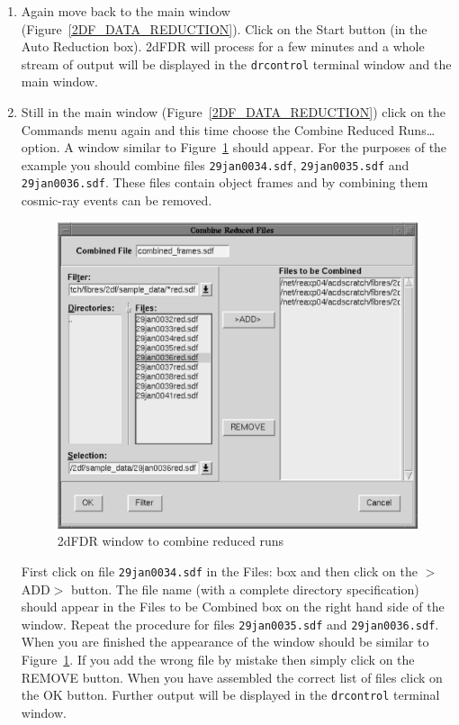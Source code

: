 \documentclass[twoside,11pt]{starlink}
\begin{document}
\begin{enumerate}
  \item Again move back to the main window
   (Figure~\ref{2DF_DATA_REDUCTION}).  Click on the \textsf{Start}
   button (in the \textsf{Auto Reduction} box).  2dFDR will process for a
   few minutes and a whole stream of output will be displayed in the
   \texttt{drcontrol} terminal window and the main window.

  \item Still in the main window (Figure~\ref{2DF_DATA_REDUCTION})
   click on the \textsf{Commands} menu again and this time choose the
   \textsf{Combine Reduced Runs\ldots} option.  A window similar to
   Figure~\ref{2DF_COMBINE_RUNS} should appear.  For the purposes of
   the example you should combine files \texttt{29jan0034.sdf},
   \texttt{29jan0035.sdf} and \texttt{29jan0036.sdf}.  These files contain
   object frames and by combining them cosmic-ray events can be
   removed.

  \begin{figure}[htbp]
     \centering
     \includegraphics[totalheight=4in]{sc14_2df_combine_runs}
     \caption{2dFDR window to combine reduced runs
     \label{2DF_COMBINE_RUNS} }
  \end{figure}

   First click on file \texttt{29jan0034.sdf} in the \textsf{Files:} box and
   then click on the \textsf{$>$ADD$>$} button.  The file name (with a
   complete directory specification) should appear in the \textsf{Files
   to be Combined} box  on the right hand side of the window.  Repeat
   the procedure for files \texttt{29jan0035.sdf} and \texttt{29jan0036.sdf}.
   When you are finished the appearance of the window should be similar
   to Figure~\ref{2DF_COMBINE_RUNS}.  If you add the wrong file by
   mistake then simply click on the \textsf{REMOVE} button.  When you have
   assembled the correct list of files click on the \textsf{OK} button.
   Further output will be displayed in the \texttt{drcontrol} terminal window.


\end{enumerate}
\end{document}
